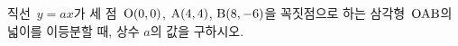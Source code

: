 직선~$y=ax$가 세 점~$\mathrm{O}(0{,}\mkern3mu\mathopen{}0)$, $\mathrm{A}(4{,}\mkern3mu\mathopen{}4)$, $\mathrm{B}(8{,}\mkern3mu\mathopen{}-6)$을 꼭짓점으로 하는 삼각형~$\mathrm{OAB}$의 넓이를 이등분할 때, 상수 $a$의 값을 구하시오.
